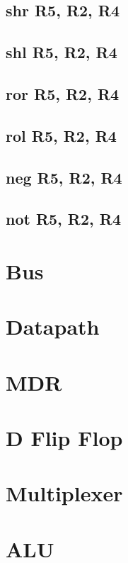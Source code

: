 \documentclass{article}
\begin{document}
\subsection{shr R5, R2, R4}
\subsection{shl R5, R2, R4}
\subsection{ror R5, R2, R4}
\subsection{rol R5, R2, R4}
\subsection{neg R5, R2, R4}
\subsection{not R5, R2, R4}

\appendix
\section{Bus}

\section{Datapath}

\section{MDR}

\section{D Flip Flop}

\section{Multiplexer}

% 
\section{ALU}

\end{document}
